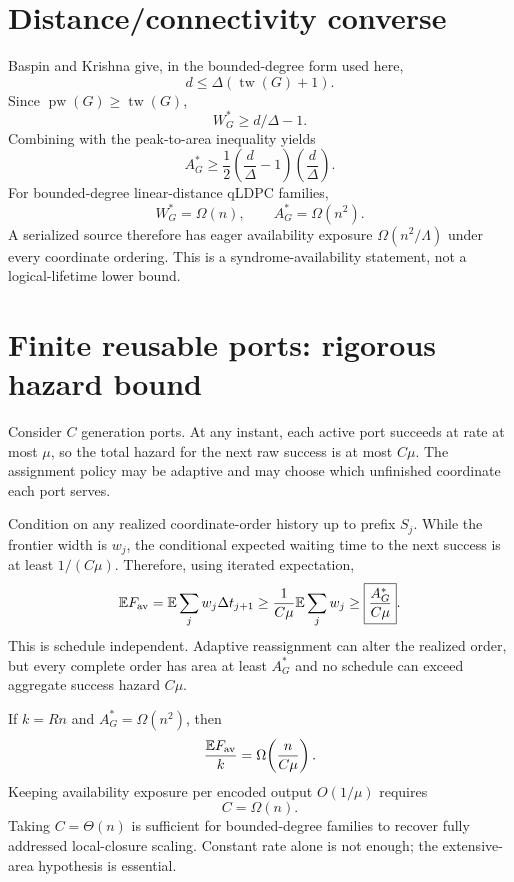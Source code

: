 \documentclass[aps,prx,preprint,superscriptaddress,nofootinbib,longbibliography]{revtex4-2}
\newcommand{\E}{\mathbb E}\newcommand{\Prob}{\mathbb P}\newcommand{\pw}{\operatorname{pw}}\newcommand{\tw}{\operatorname{tw}}
\begin{document}
\section{Distance/connectivity converse}
Baspin and Krishna give, in the bounded-degree form used here,
\begin{equation}
d\le\Delta(\tw(G)+1).
\end{equation}
Since $\pw(G)\ge\tw(G)$,
\begin{equation}
W_G^*\ge d/\Delta-1.
\end{equation}
Combining with the peak-to-area inequality yields
\begin{equation}
A_G^*\ge\frac12\left(\frac d\Delta-1\right)\left(\frac d\Delta\right).
\end{equation}
For bounded-degree linear-distance qLDPC families,
\begin{equation}
W_G^*=\Omega(n),\qquad A_G^*=\Omega(n^2).
\end{equation}
A serialized source therefore has eager availability exposure $\Omega(n^2/\Lambda)$ under every coordinate ordering. This is a syndrome-availability statement, not a logical-lifetime lower bound.

\section{Finite reusable ports: rigorous hazard bound}
Consider $C$ generation ports. At any instant, each active port succeeds at rate at most $\mu$, so the total hazard for the next raw success is at most $C\mu$. The assignment policy may be adaptive and may choose which unfinished coordinate each port serves.

Condition on any realized coordinate-order history up to prefix $S_j$. While the frontier width is $w_j$, the conditional expected waiting time to the next success is at least $1/(C\mu)$. Therefore, using iterated expectation,
\begin{equation}
\E F_{\rm av}
=\E\sum_j w_j\Delta t_{j+1}
\ge\frac1{C\mu}\E\sum_jw_j
\ge\boxed{\frac{A_G^*}{C\mu}}.
\end{equation}
This is schedule independent. Adaptive reassignment can alter the realized order, but every complete order has area at least $A_G^*$ and no schedule can exceed aggregate success hazard $C\mu$.

If $k=Rn$ and $A_G^*=\Omega(n^2)$, then
\begin{equation}
\frac{\E F_{\rm av}}{k}=\Omega\!\left(\frac{n}{C\mu}\right).
\end{equation}
Keeping availability exposure per encoded output $O(1/\mu)$ requires
\begin{equation}
C=\Omega(n).
\end{equation}
Taking $C=\Theta(n)$ is sufficient for bounded-degree families to recover fully addressed local-closure scaling. Constant rate alone is not enough; the extensive-area hypothesis is essential.
\end{document}
